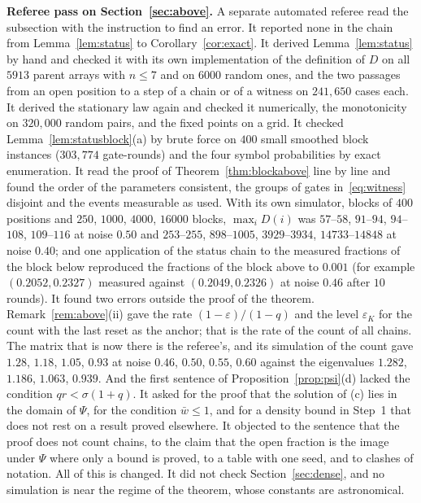 \documentclass[11pt]{amsart}
\theoremstyle{definition}
\theoremstyle{remark}
\newcommand{\eps}{\varepsilon}
\begin{document}
\medskip\noindent\textbf{Referee pass on Section~\ref{sec:above}.} A separate automated referee
read the subsection with the instruction to find an error. It reported none in the chain from
Lemma~\ref{lem:status} to Corollary~\ref{cor:exact}. It derived Lemma~\ref{lem:status} by hand and
checked it with its own implementation of the definition of $D$ on all $5913$ parent arrays with
$n\le7$ and on $6000$ random ones, and the two passages from an open position to a step of a
chain or of a witness on $241{,}650$ cases each. It derived the stationary law again and checked
it numerically, the monotonicity on $320{,}000$ random pairs, and the fixed points on a grid. It
checked Lemma~\ref{lem:statusblock}(a) by brute force on $400$ small smoothed block instances
($303{,}774$ gate-rounds) and the four symbol probabilities by exact enumeration. It read the
proof of Theorem~\ref{thm:blockabove} line by line and found the order of the parameters
consistent, the groups of gates in~\eqref{eq:witness} disjoint and the events measurable as
used. With its own simulator, blocks of $400$ positions and $250$, $1000$, $4000$, $16000$
blocks, $\max_iD(i)$ was $57$--$58$, $91$--$94$, $94$--$108$, $109$--$116$ at noise $0.50$ and
$253$--$255$, $898$--$1005$, $3929$--$3934$, $14733$--$14848$ at noise $0.40$; and one
application of the status chain to the measured fractions of the block below reproduced the
fractions of the block above to $0.001$ (for example $(0.2052,0.2327)$ measured against
$(0.2049,0.2326)$ at noise $0.46$ after $10$ rounds). It found two errors outside the proof of
the theorem. Remark~\ref{rem:above}(ii) gave the rate $(1-\eps)/(1-q)$ and the level $\eps_K$ for
the count with the last reset as the anchor; that is the rate of the count of all chains. The
matrix that is now there is the referee's, and its simulation of the count gave $1.28$, $1.18$,
$1.05$, $0.93$ at noise $0.46$, $0.50$, $0.55$, $0.60$ against the eigenvalues $1.282$, $1.186$,
$1.063$, $0.939$. And the first sentence of Proposition~\ref{prop:psi}(d) lacked the condition
$qr<\sigma(1+q)$. It asked for the proof that the solution of (c) lies in the domain of $\Psi$,
for the condition $\bar w\le1$, and for a density bound in Step~1 that does not rest on a result
proved elsewhere. It objected to the sentence that the proof does not count chains, to the claim
that the open fraction is the image under $\Psi$ where only a bound is proved, to a table with one
seed, and to clashes of notation. All of this is changed. It did not check Section~\ref{sec:dense},
and no simulation is near the regime of the theorem, whose constants are astronomical.
\end{document}
